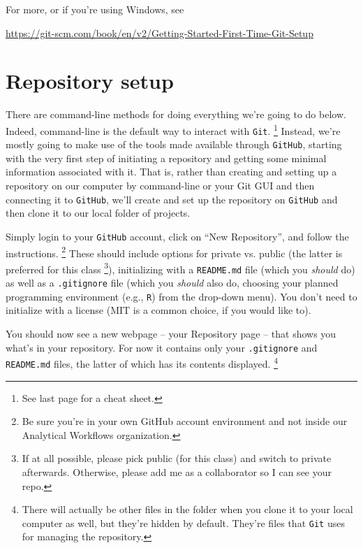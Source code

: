 \documentclass[12pt,letterpaper]{article}
\begin{document}
\noindent
For more, or if you're using Windows, see\\
\begin{footnotesize}
\url{https://git-scm.com/book/en/v2/Getting-Started-First-Time-Git-Setup}
\end{footnotesize}




\section{Repository setup}
There are command-line methods for doing everything we're going to do below.
Indeed, command-line is the default way to interact with \texttt{Git}.
\unskip\footnote{See last page for a cheat sheet.}
Instead, we're mostly going to make use of the tools made available through 
\texttt{GitHub}, 
starting with the very first step of initiating a repository and 
getting some minimal information associated with it.
That is, rather than creating and setting up a repository on our computer by 
command-line or your Git GUI and then connecting it to \texttt{GitHub}, 
we'll create and set up the repository on \texttt{GitHub} and then clone it to our local folder of projects.

Simply login to your \texttt{GitHub} account, 
click on ``New Repository'', 
and follow the instructions.
\unskip
\footnote{
Be sure you're in your own GitHub account environment and not inside our 
Analytical Workflows organization.}
These should include options for private vs. public
(the latter is preferred for this class
\unskip
\footnote{
	If at all possible, please pick public (for this class) and switch to private afterwards.  
	Otherwise, please add me as a collaborator so I can see your repo.}), 
initializing with a \texttt{README.md} file 
(which you \emph{should} do)
as well as a \texttt{.gitignore} file 
(which you \emph{should} also do, 
choosing your planned programming environment
(e.g., \texttt{R}) from the drop-down menu).
You don't need to initialize with a license 
(MIT is a common choice, if you would like to).

You should now see a new webpage -- your Repository page -- that shows you 
what's in your repository.
For now it contains only your \texttt{.gitignore} and \texttt{README.md} files, 
the latter of which has its contents displayed.
\unskip
\footnote{
	There will actually be other files in the folder when you clone it to your local computer as well, 
	but they're hidden by default.  
	They're files that \texttt{Git} uses for managing the repository.}
	
\end{document}
